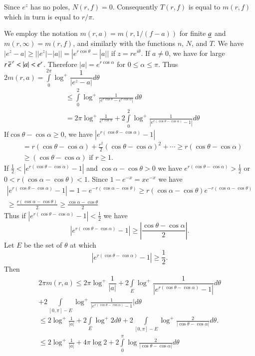 Since $e^{z}$ has no poles, $N(r,f)=0$. Consequently $T(r,f)$ is equal
to $m(r,f)$ which in turn is equal to $r/\pi$.

We employ the notation $m(r,a)=m(r,1/(f-a))$ for finite $\underline{a}$ and
$m(r,\infty)=m(r,f)$, and similarly with the functions $n$, $N$, and
$T$. We have $|e^{z}-a|\geq ||e^{z}|-|a||=|e^{r\cos \theta}-|a||$ if
$z=re^{i\theta}$. If $a\neq 0$, we have for large
$r \, \ob{e}^{\,r}<|a|<e^{r}$. Therefore $|a|=e^{r\cos \alpha}$ for $0\leq
\alpha\leq\pi$. Thus
$2m(r,a)=\int\limits^{2\pi}_{0}\log^{+}\dfrac{1}{|e^{z}-a|}d\theta$
\begin{align*}
& \leq \int\limits^{2}_{0}\log^{+}\frac{1}{|e^{r\cos\theta}-e^{r\cos
      \alpha}|} \,d\theta\\
&=
  2\pi\log^{+}\frac{1}{e^{r\cos\alpha}}+2\int\limits^{2}_{0}\log^{+}\frac{1}{|e^{r(\cos\theta-\cos\alpha)}-1|}d\theta 
\end{align*}
If\pageoriginale $\cos\theta-\cos\alpha\geq 0$, we have
$|e^{r(\cos\theta-\cos\alpha)} -1|$
\begin{align*}
&=
  r(\cos\theta-\cos\alpha)+\frac{r^{2}}{2}(\cos\theta-\cos\alpha)^{2}+\cdots\geq
  r(\cos\theta-\cos\alpha)\\
&\geq (\cos\theta-\cos\alpha)\text{ \ if \ } r\geq 1.
\end{align*}
If $\frac{1}{2}<|e^{r(\cos\theta-\cos\alpha)}-1|$ and
$\cos\alpha-\cos\theta>0$ we have
$e^{r(\cos\theta-\cos\alpha)}>\frac{1}{2}$ or
$0<r(\cos\alpha-\cos\theta)<1$. Since $1-e^{-x}=xe^{-x}$ we have
\begin{gather*}
|e^{r(\cos\theta-\cos\alpha)}-1|=1-e^{-r(\cos\alpha-\cos\theta)}\geq
r(\cos\alpha-\cos\theta)e^{-r(\cos\alpha-\cos\theta)}\\
\geq \frac{r(\cos\alpha-\cos\theta)}{2}\geq \frac{\cos\alpha-\cos\theta}{2}
\end{gather*}
Thus if $|e^{r(\cos\theta-\cos\alpha)}-1|<\frac{1}{2}$ we have
$$
|e^{r(\cos\theta-\cos\alpha)}-1|\geq
|\frac{\cos\theta-\cos\alpha}{2}|.
$$
Let $E$ be the set of $\theta$ at which
$$
|e^{r(\cos\theta-\cos\alpha)}-1|\geq \frac{1}{2}.
$$
Then 
\begin{gather*}
2\pi m(r,a)\leq 2\pi
\log^{+} \dfrac{1}{|a|} + 2\int\limits_{E}\log^{+}
\dfrac{1}{|e^{r(\cos\theta-\cos\alpha)}-1|}d\theta\\ 
+2\int\limits_{[0,\pi]-E}\log^{+}
\frac{1}{|e^{r(\cos\theta-\cos\alpha)}-1}\big|d\theta\\ 
\leq 2\log^{+}\frac{1}{|a|} + 2\int\limits_{E}\log^{+}
2d\theta + 2\int\limits_{[0,\pi]-E}
\log^{+}\frac{2}{|\cos\theta-\cos\alpha|}d\theta.\\  
\leq 2 \log^{+}\frac{1}{|a|}+4\pi \log
2+2\int\limits^{\pi}_{0}\log\frac{2}{|\cos\theta-\cos\alpha|}d\theta
\end{gather*}


